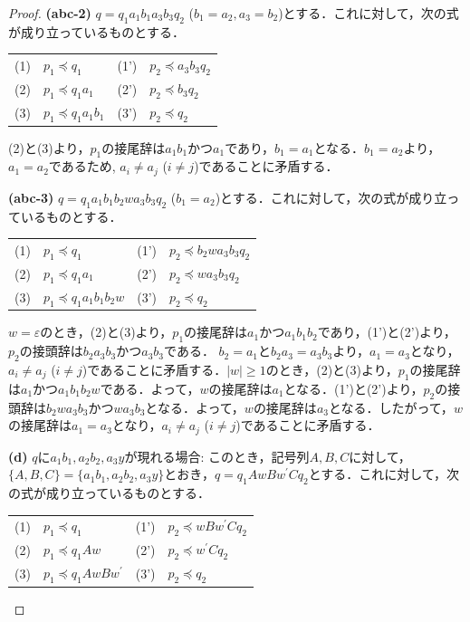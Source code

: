 \begin{proof}
\textbf{(abc-2)} $q=q_{1}a_{1}b_{1}a_{3}b_{3}q_{2}$ ($b_{1}=a_{2}, a_{3}=b_{2}$)とする．これに対して，次の式が成り立っているものとする．
\smallskip

\begin{tabular}{llll}
(1) & $p_{1} \preceq q_{1}$ & (1') & $p_{2} \preceq a_{3}b_{3}q_{2}$ \\
(2) & $p_{1} \preceq q_{1}a_{1}$ & (2') & $p_{2} \preceq b_{3}q_{2}$ \\
(3) & $p_{1} \preceq q_{1}a_{1}b_{1}$ & (3') & $p_{2} \preceq q_{2}$
\end{tabular}
\smallskip

(2)と(3)より，$p_{1}$の接尾辞は$a_{1}b_{1}$かつ$a_{1}$であり，$b_{1}=a_{1}$となる．$b_{1}=a_{2}$より，$a_{1}=a_{2}$であるため, $a_{i} \ne a_{j}$ ($i \ne j$)であることに矛盾する．
\smallskip

\textbf{(abc-3)} $q=q_{1}a_{1}b_{1}b_{2}wa_{3}b_{3}q_{2}$ ($b_{1}=a_{2}$)とする．これに対して，次の式が成り立っているものとする．
\smallskip

\begin{tabular}{llll}
(1) & $p_{1} \preceq q_{1}$ & (1') & $p_{2} \preceq b_{2}wa_{3}b_{3}q_{2}$ \\
(2) & $p_{1} \preceq q_{1}a_{1}$ & (2') & $p_{2} \preceq wa_{3}b_{3}q_{2}$ \\
(3) & $p_{1} \preceq q_{1}a_{1}b_{1}b_{2}w$ & (3') & $p_{2} \preceq q_{2}$
\end{tabular}
\smallskip

$w=\varepsilon$のとき，(2)と(3)より，$p_{1}$の接尾辞は$a_{1}$かつ$a_{1}b_{1}b_{2}$であり，(1')と(2')より，$p_{2}$の接頭辞は$b_{2}a_{3}b_{3}$かつ$a_{3}b_{3}$である．
$b_{2}=a_{1}$と$b_{2}a_{3}=a_{3}b_{3}$より，$a_{1}=a_{3}$となり，$a_{i} \ne a_{j}$ ($i \ne j$)であることに矛盾する．$|w| \ge 1$のとき，(2)と(3)より，$p_{1}$の接尾辞は$a_{1}$かつ$a_{1}b_{1}b_{2}w$である．よって，$w$の接尾辞は$a_{1}$となる．(1')と(2')より，$p_{2}$の接頭辞は$b_{2}wa_{3}b_{3}$かつ$wa_{3}b_{3}$となる．よって，$w$の接尾辞は$a_{3}$となる．したがって，$w$の接尾辞は$a_{1}=a_{3}$となり，$a_{i} \ne a_{j}$ ($i \ne j$)であることに矛盾する．
\smallskip

\textbf{(d)} $q$に$a_{1}b_{1}, a_{2}b_{2}, a_{3}y$が現れる場合: このとき，記号列$A,B,C$に対して，$\{ A, B, C \} = \{ a_{1}b_{1}, a_{2}b_{2}, a_{3}y \}$とおき，$q=q_{1}AwBw^{\prime}Cq_{2}$とする．これに対して，次の式が成り立っているものとする．
\smallskip

\begin{tabular}{llll}
(1) & $p_{1} \preceq q_{1}$ & (1') & $p_{2} \preceq wBw^{\prime}Cq_{2}$ \\
(2) & $p_{1} \preceq q_{1}Aw$ & (2') & $p_{2} \preceq w^{\prime}Cq_{2}$ \\
(3) & $p_{1} \preceq q_{1}AwBw^{\prime}$ & (3') & $p_{2} \preceq q_{2}$	
\end{tabular}
\smallskip


\end{proof}
